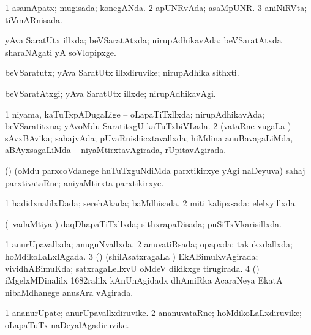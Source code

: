 {\bentry
{} 
\gl{\gu}
\expl{}
\bmng
\bnum
\num{1} asamApatx; mugisada; konegANda. 
\num{2} apUNRvAda; asaMpUNR.
\num{3} aniNiRVta; tiVmARnisada. 
\enum
\emng
\eentry

\bentry
{} 
\gl{\gu}
\expl{}
\bmng
 yAva SaratUtx illxda; beVSaratAtxda; nirupAdhikavAda:  beVSaratAtxda sharaNAgati yA soVlopipxge. 
\emng
\eentry

\bentry
{} 
\gl{\nA}
\expl{}
\bmng
 beVSaratutx; yAva SaratUtx illxdiruvike; nirupAdhika sithxti. 
\emng
\eentry

\bentry
{} 
\gl{\kirxvi}
\expl{}
\bmng
 beVSaratAtxgi; yAva SaratUtx illxde; nirupAdhikavAgi. 
\emng
\eentry

\bentry
{} 
\gl{\gu}
\expl{}
\bmng
\bnum
\num{1} niyama, kaTuTxpADugaLige -- oLapaTiTxllxda; nirupAdhikavAda; beVSaratitxna; yAvoMdu SaratitxgU kaTuTxbiVLada. 
\num{2} (vataRne \mo vugaLa \vi) sAvxBAvika; sahajvAda; pUvaRnishicxtavallxda; hiMdina anuBavagaLiMda, aBAyxsagaLiMda -- niyaMtirxtavAgirada, rUpitavAgirada. 
\enum
\emng

\noindent 
\gl{\pagu}
\expl{}
\bmng
{} (\mavi) (oMdu parxcoVdanege huTuTxguNdiMda parxtikirxye yAgi naDeyuva) sahaj parxtivataRne; aniyaMtirxta parxtikirxye. 
\emng
\eentry

\bentry
{} 
\gl{\gu}
\expl{}
\bmng
\bnum
\num{1} hadidxnalilxDada; serehAkada; baMdhisada. 
\num{2} miti kalipxsada; elelxyillxda. 
\enum
\emng
\eentry

\bentry
{} 
\gl{\gu}
\expl{}
\bmng
 (\kanmu\ vadaMtiya \vi) daqDhapaTiTxllxda; sithxrapaDisada; puSiTxVkarisillxda. 
\emng
\eentry

\bentry
{} 
\gl{\gu}
\expl{}
\bmng
\bnum
\num{1} anurUpavallxda; anuguNvallxda. 
\num{2} anuvatiRsada; opapxda; takukxdallxda; hoMdikoLaLxlAgada. 
\num{3} (\BUvi) (shilAsatxragaLa \vi) EkABimuKvAgirada; vividhABimuKda; satxragaLellxvU oMdeV dikikxge tirugirada. 
\num{4} (\ca) iMgelxMDinalilx 1682ralilx kAnUnAgidadx dhAmiRka AcaraNeya EkatA nibaMdhanege anusAra vAgirada. 
\enum
\emng
\eentry

\bentry
{} 
\gl{\nA}
\expl{}
\bmng
\bnum
\num{1} ananurUpate; anurUpavallxdiruvike. 
\num{2} ananuvataRne; hoMdikoLaLxdiruvike; oLapaTuTx naDeyalAgadiruvike. 
\enum
\emng
\eentry

}
